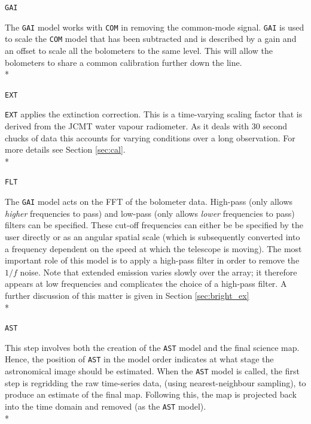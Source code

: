 \documentclass[twoside,11pt]{article}
\renewcommand{\_}{\texttt{\symbol{95}}}
\begin{document}
\begin{minipage}[t]{0.07\linewidth}
\texttt{GAI}
\end{minipage}
\begin{minipage}[t]{0.92\linewidth}The \texttt{GAI} model works with  \texttt{COM} in removing the common-mode signal. \texttt{GAI} is used to scale the \texttt{COM} model that has been subtracted and is described by a gain and an offset to scale all the bolometers to the same level. This will allow the bolometers to share a common calibration further down the line. \\*
\end{minipage}
\begin{minipage}[t]{0.07\linewidth}
\texttt{EXT}
\end{minipage}
\begin{minipage}[t]{0.92\linewidth}\texttt{EXT} applies the extinction correction. This is a time-varying scaling factor that is derived from the JCMT water vapour radiometer. As it deals with 30 second chucks of data this accounts for varying conditions over a long observation. For more details see Section \ref{sec:cal}. \\*
\end{minipage}
\begin{minipage}[t]{0.07\linewidth}
\texttt{FLT}
\end{minipage}
\begin{minipage}[t]{0.92\linewidth}The \texttt{GAI} model acts on the FFT of the bolometer data. High-pass (only allows \emph{higher} frequencies to pass) and low-pass (only allows \emph{lower} frequencies to pass) filters can be specified. These cut-off frequencies can either be be specified by the user directly  or as an angular spatial scale (which is subsequently converted into a frequency dependent on the speed at which the telescope is moving). The most important role of this model is to apply a high-pass filter in order to remove the $1/f$ noise. Note that extended emission varies slowly over the array; it therefore appears at low frequencies and complicates the choice of a high-pass filter. A further discussion of this matter is given in Section \ref{sec:bright_ex}\\*
\end{minipage}
\begin{minipage}[t]{0.07\linewidth}
\texttt{AST}
\end{minipage}
\begin{minipage}[t]{0.92\linewidth}This step involves both the creation of the \texttt{AST} model and the final science map. Hence, the position of \texttt{AST} in the model order indicates at what stage the astronomical image should be estimated. When the \texttt{AST} model is called, the first step is regridding the raw time-series data, (using nearest-neighbour sampling), to produce an estimate of the final map. Following this, the map is projected back into the time domain and removed (as the \texttt{AST} model).\\*
\end{minipage}
\end{document}
